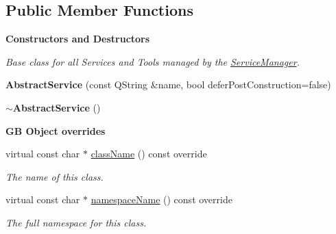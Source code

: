 \subsection*{Public Member Functions}
\begin{Indent}\textbf{ Constructors and Destructors}\par
{\em Base class for all Services and Tools managed by the \mbox{\hyperlink{classrev_1_1_service_manager}{Service\+Manager}}. }\begin{DoxyCompactItemize}
\item 
\mbox{\label{classrev_1_1_abstract_service_acc53309b0279a9f873c4bcaad1d90b7c}} 
{\bfseries Abstract\+Service} (const Q\+String \&name, bool defer\+Post\+Construction=false)
\item 
\mbox{\label{classrev_1_1_abstract_service_a960cbb70c737f308c0011fded5eaf126}} 
{\bfseries $\sim$\+Abstract\+Service} ()
\end{DoxyCompactItemize}
\end{Indent}
\begin{Indent}\textbf{ GB Object overrides}\par
\begin{DoxyCompactItemize}
\item 
virtual const char $\ast$ \mbox{\hyperlink{classrev_1_1_abstract_service_a0b64ee4651db7637a70265697ca62453}{class\+Name}} () const override
\begin{DoxyCompactList}\small\item\em The name of this class. \end{DoxyCompactList}\item 
virtual const char $\ast$ \mbox{\hyperlink{classrev_1_1_abstract_service_a062e932eaa2eab0109288f2b32e459f7}{namespace\+Name}} () const override
\begin{DoxyCompactList}\small\item\em The full namespace for this class. \end{DoxyCompactList}\end{DoxyCompactItemize}
\end{Indent}
